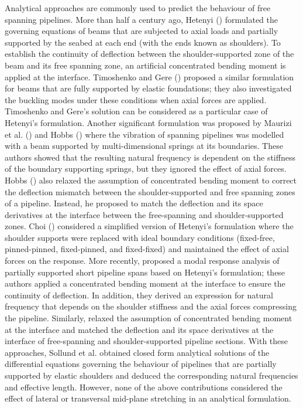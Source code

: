 \documentclass[3p,doublespacing,authoryear,11pt]{elsarticle} %
\begin{document}
Analytical approaches are commonly used to predict the behaviour of free spanning pipelines. More than half a century ago, Hetenyi (\citeyear{Hetenyi}) formulated the governing equations of beams that are subjected to axial loads and partially supported by the seabed at each end (with the ends known as shoulders). To establish the continuity of deflection between the shoulder-supported zone of the beam and its free spanning zone, an artificial concentrated bending moment is applied at the interface. Timoshenko and Gere (\citeyear{Timoshenko_Gere}) proposed a similar formulation for beams that are fully supported by elastic foundations; they also investigated the buckling modes under these conditions when axial forces are applied. Timoshenko and Gere's solution can be considered as a particular case of Hetenyi's formulation. Another significant formulation was proposed by Maurizi et al. (\citeyear{Maurizi:1976aa}) and Hobbs (\citeyear{Hobbs86}) where the vibration of spanning pipelines was modelled with a beam supported by multi-dimensional springs at its boundaries. These authors showed that the resulting natural frequency is dependent on the stiffness of the boundary supporting springs, but they ignored the effect of axial forces. Hobbs (\citeyear{Hobbs86}) also relaxed the assumption of concentrated bending moment to correct the deflection mismatch between the shoulder-supported and free spanning zones of a pipeline. Instead, he proposed to match the deflection and its space derivatives at the interface between the free-spanning and shoulder-supported zones. Choi (\citeyear{Choi:2001aa}) considered a simplified version of Hetenyi's formulation where the shoulder supports were replaced with ideal boundary conditions (fixed-free, pinned-pinned, fixed-pinned, and fixed-fixed) and maintained the effect of axial forces on the response. More recently,  \cite{Sollund:2015ab} proposed a modal response analysis of partially supported short pipeline spans based on Hetenyi's formulation; these authors applied a concentrated bending moment at the interface to ensure the continuity of deflection. In addition, they derived an expression for natural frequency that depends on the shoulder stiffness and the axial forces compressing the pipeline. Similarly, \cite {Sollund:2015aa} relaxed the assumption of concentrated bending moment at the interface and matched the deflection and its space derivatives at the interface of free-spanning and shoulder-supported pipeline sections. With these approaches, Sollund et al. obtained closed form analytical solutions of the differential equations governing the behaviour of pipelines that are partially supported by elastic shoulders and deduced the corresponding natural frequencies and effective length. However, none of the above contributions considered the effect of lateral or transversal mid-plane stretching in an analytical formulation.   
\end{document}
